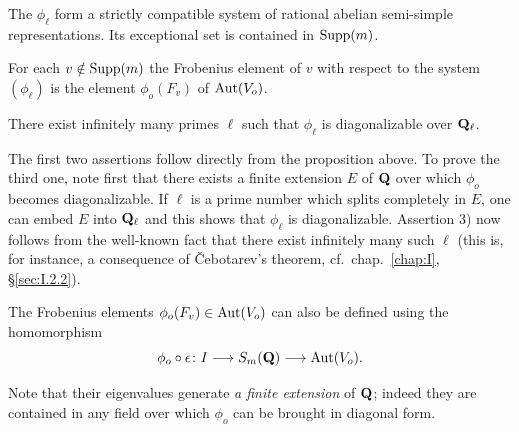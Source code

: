 \begin{theorem}
\begin{nlist}
\item The $\phi_\ell$ form a strictly compatible system of rational
abelian semi-simple representations.  Its exceptional set is contained
in $\mathrm{Supp}(m)$.
\item For each $v \notin \mathrm{Supp}(m)$ the Frobenius element of $v$ with
respect to the system $(\phi_\ell)$ is the element $\phi_o(F_v)$ of
$\mathrm{Aut}(V_o)$.
\item There exist infinitely many primes $\ell$ such that $\phi_\ell$
is diagonalizable over $\mathbf{Q}_\ell$.
\end{nlist}
\end{theorem}

The first two assertions follow directly from the proposition above.
To prove the third one, note first that there exists a finite extension
$E$ of $\mathbf{Q}$ over which $\phi_o$ becomes diagonalizable.  If $\ell$ is a
prime number which splits completely in $E$, one can embed $E$ into
$\mathbf{Q}_\ell$ and this shows that $\phi_\ell$ is diagonalizable.  Assertion
3) now follows from the well-known fact that there exist infinitely
many such $\ell$ (this is, for instance, a consequence of
\v{C}ebotarev's theorem, cf.~chap.~\ref{chap:I}, \S\ref{sec:I.2.2}).


The Frobenius elements $\phi_o(F_v) \in \mathrm{Aut}(V_o)$ can also be defined
using the homomorphism
\[
\phi_o \circ \epsilon\colon I \longrightarrow S_m(\mathbf{Q})
\longrightarrow \mathrm{Aut}(V_o).
\]

Note that their eigenvalues generate \emph{a finite extension} of $\mathbf{Q}$;
indeed they are contained in any field over which $\phi_o$ can be
brought in diagonal form.

